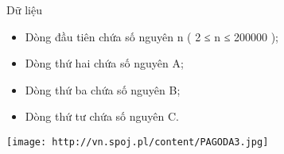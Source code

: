 Dữ liệu
\begin{itemize}
	\item Dòng đầu tiên chứa số nguyên n ( 2 ≤ n ≤ 200000 );
	\item Dòng thứ hai chứa số nguyên A;
	\item Dòng thứ ba chứa số nguyên B;
	\item Dòng thứ tư chứa số nguyên C.
\end{itemize}


\texttt{[image: http://vn.spoj.pl/content/PAGODA3.jpg]}